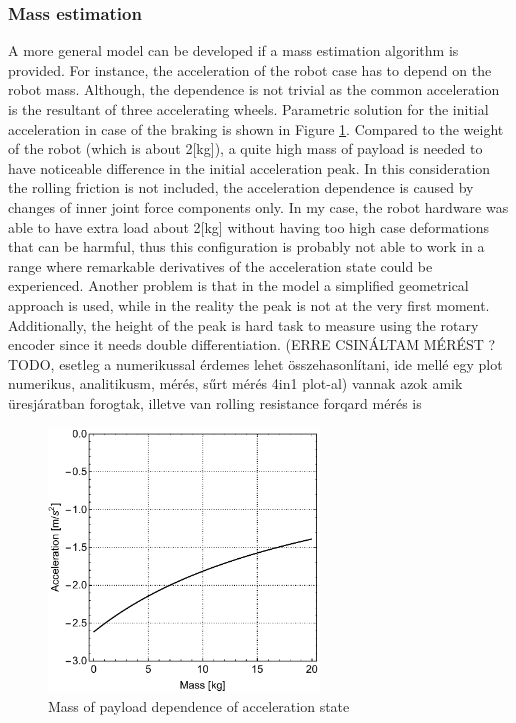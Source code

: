 \documentclass[12pt,english]{article}
\begin{document}
\subsubsection{Mass estimation}
A more general model can be developed if a mass estimation algorithm is provided. For instance, the acceleration of the robot case has to depend on the robot mass. Although, the dependence is not trivial as the common acceleration is the resultant of three accelerating wheels. Parametric solution for the initial acceleration in case of the braking is shown in Figure \ref{massDep}. Compared to the weight of the robot (which is about 2[kg]), a quite high mass of payload is needed to have noticeable difference in the initial acceleration peak. In this consideration the rolling friction is not included, the acceleration dependence is caused by changes of inner joint force components only. In my case, the robot hardware was able to have extra load about 2[kg] without having too high case deformations that can be harmful, thus this configuration is probably not able to work in a range where remarkable derivatives of the acceleration state could be experienced. Another problem is that in the model a simplified geometrical approach is used, while in the reality the peak is not at the very first moment. Additionally, the height of the peak is hard task to measure using the rotary encoder since it needs double differentiation. (ERRE CSINÁLTAM MÉRÉST ? TODO, esetleg a numerikussal érdemes lehet összehasonlítani, ide mellé egy plot numerikus, analitikusm, mérés, sűrt mérés 4in1 plot-al)
vannak azok amik üresjáratban forogtak, illetve van rolling resistance forqard mérés is
\begin{figure}[htb!]
	\centering
	\includegraphics[height=7cm]{figures/massDep}
	\caption{Mass of payload dependence of acceleration state}
	\label{massDep}
\end{figure}
\end{document}

